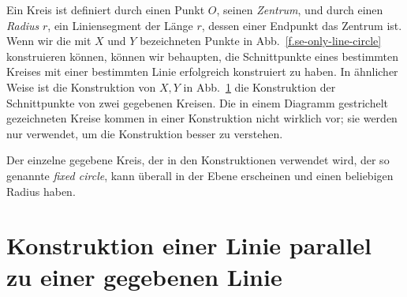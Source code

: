 Ein Kreis ist definiert durch einen Punkt $O$, seinen \emph{Zentrum}, und durch einen \emph{Radius} $r$, ein Liniensegment der Länge $r$, dessen einer Endpunkt das Zentrum ist. Wenn wir die mit $X$ und $Y$ bezeichneten Punkte in Abb.~\ref{f.se-only-line-circle} konstruieren können, können wir behaupten, die Schnittpunkte eines bestimmten Kreises mit einer bestimmten Linie erfolgreich konstruiert zu haben. In ähnlicher Weise ist die Konstruktion von $X,Y$ in Abb.~\ref{f.se-only-two-circles} die Konstruktion der Schnittpunkte von zwei gegebenen Kreisen. Die in einem Diagramm gestrichelt gezeichneten Kreise kommen in einer Konstruktion nicht wirklich vor; sie werden nur verwendet, um die Konstruktion besser zu verstehen.

Der einzelne gegebene Kreis, der in den Konstruktionen verwendet wird, der so genannte \emph{fixed circle}, kann überall in der Ebene erscheinen und einen beliebigen Radius haben.

\begin{figure}[t]
\subfigures
{}
\hfill
{}
\label{f.se-only-line-circle}
\label{f.se-only-two-circles}
\end{figure}

\section{Konstruktion einer Linie parallel zu einer gegebenen Linie}\label{s.parallel}

